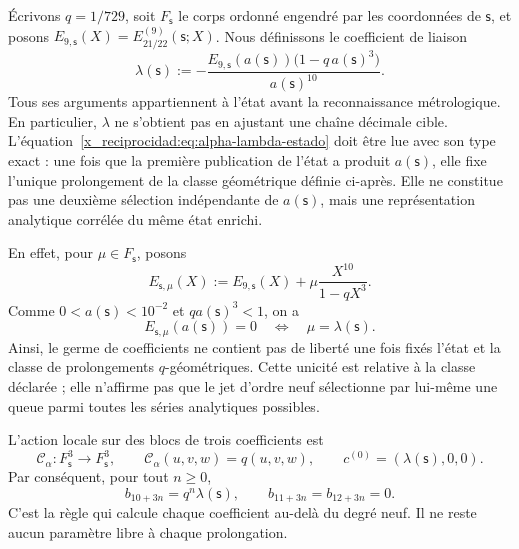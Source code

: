 Écrivons \(q=1/729\), soit \(F_{\mathsf s}\) le corps ordonné engendré par
les coordonnées de \(\mathsf s\), et posons
\(E_{9,\mathsf s}(X)=E_{21/22}^{(9)}(\mathsf s;X)\). Nous définissons le coefficient
de liaison
\begin{equation}
 \lambda(\mathsf s):=
 -\frac{E_{9,\mathsf s}(a(\mathsf s))
         \bigl(1-q\,a(\mathsf s)^3\bigr)}{a(\mathsf s)^{10}}.
 \label{x_reciprocidad:eq:alpha-lambda-estado}
\end{equation}
Tous ses arguments appartiennent à l'état avant la reconnaissance métrologique. En particulier, \(\lambda\) ne s'obtient pas en ajustant une chaîne décimale cible. L'équation~\eqref{x_reciprocidad:eq:alpha-lambda-estado} doit être lue avec son type exact : une fois que la première publication de l'état a produit \(a(\mathsf s)\), elle fixe l'unique prolongement de la classe géométrique définie ci-après. Elle ne constitue pas une deuxième sélection indépendante de \(a(\mathsf s)\), mais une représentation analytique corrélée du même état enrichi.

En effet, pour \(\mu\in F_{\mathsf s}\), posons
\[
 E_{\mathsf s,\mu}(X)
 :=E_{9,\mathsf s}(X)+\mu\frac{X^{10}}{1-qX^3}.
\]
Comme \(0<a(\mathsf s)<10^{-2}\) et \(qa(\mathsf s)^3<1\), on a
\begin{equation}
 E_{\mathsf s,\mu}(a(\mathsf s))=0
 \quad\Longleftrightarrow\quad
 \mu=\lambda(\mathsf s).
 \label{x_reciprocidad:eq:alpha-unicidad-lambda-clase-geometrica}
\end{equation}
Ainsi, le germe de coefficients ne contient pas de liberté une fois fixés l'état
et la classe de prolongements \(q\)-géométriques. Cette unicité est relative à la
classe déclarée ; elle n'affirme pas que le jet d'ordre neuf sélectionne par lui-même une
queue parmi toutes les séries analytiques possibles.

L'action locale sur des blocs de trois coefficients est
\begin{equation}
 \mathcal C_\alpha:F_{\mathsf s}^{3}\longrightarrow F_{\mathsf s}^{3},
 \qquad \mathcal C_\alpha(u,v,w)=q(u,v,w),
 \qquad c^{(0)}=(\lambda(\mathsf s),0,0).
 \label{x_reciprocidad:eq:alpha-accion-coeficientes}
\end{equation}
Par conséquent, pour tout \(n\geq0\),
\begin{equation}
 b_{10+3n}=q^n\lambda(\mathsf s),\qquad
 b_{11+3n}=b_{12+3n}=0.
 \label{x_reciprocidad:eq:alpha-recurrencia-coeficientes}
\end{equation}
C'est la règle qui calcule chaque coefficient au-delà du degré neuf. Il ne
reste aucun paramètre libre à chaque prolongation.

